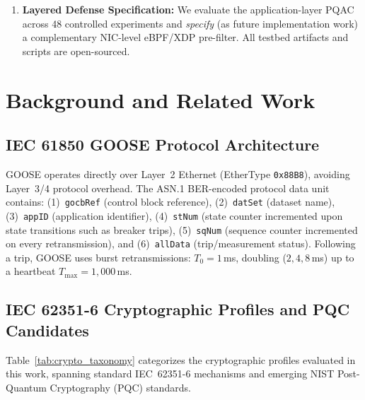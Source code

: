 \documentclass[journal]{IEEEtran}
\begin{document}
\begin{enumerate}[leftmargin=*,noitemsep,topsep=1pt]
    \item \textbf{Layered Defense Specification:} We evaluate the application-layer PQAC across 48 controlled experiments and \emph{specify} (as future implementation work) a complementary NIC-level eBPF/XDP pre-filter. All testbed artifacts and scripts are open-sourced.
\end{enumerate}

\section{Background and Related Work}
\label{sec:background}

\subsection{IEC 61850 GOOSE Protocol Architecture}
GOOSE operates directly over Layer~2 Ethernet (EtherType \texttt{0x88B8}), avoiding Layer~3/4 protocol overhead. The ASN.1 BER-encoded protocol data unit contains:
(1)~\texttt{gocbRef} (control block reference), (2)~\texttt{datSet} (dataset name), (3)~\texttt{appID} (application identifier), (4)~\texttt{stNum} (state counter incremented upon state transitions such as breaker trips), (5)~\texttt{sqNum} (sequence counter incremented on every retransmission), and (6)~\texttt{allData} (trip/measurement status).
Following a trip, GOOSE uses burst retransmissions: $T_0 = 1$\,ms, doubling ($2, 4, 8$\,ms) up to a heartbeat $T_{\max} = 1,000$\,ms.

\subsection{IEC 62351-6 Cryptographic Profiles and PQC Candidates}
Table~\ref{tab:crypto_taxonomy} categorizes the cryptographic profiles evaluated in this work, spanning standard IEC~62351-6 mechanisms and emerging NIST Post-Quantum Cryptography (PQC) standards.
\end{document}
